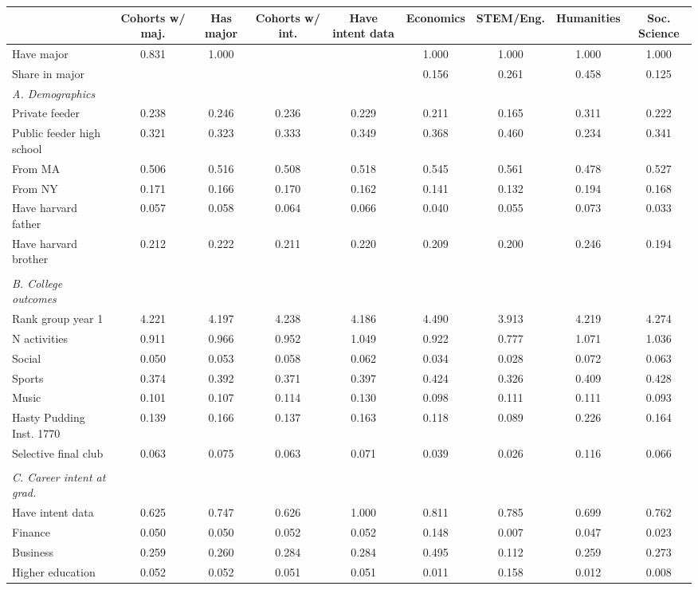 \begin{tabular}{l*{8}{c}}
\toprule
& Cohorts w/ maj.& Has major& Cohorts w/ int.& Have intent data& Economics& STEM/Eng.& Humanities& Soc. Science\\
\midrule
Have major	&    0.831	&    1.000	&	&	&    1.000	&    1.000	&    1.000	&    1.000\\
Share in major	&	&	&	&	&    0.156	&    0.261	&    0.458	&    0.125\\
\emph{A. Demographics}\\
Private feeder& 0.238& 0.246& 0.236& 0.229& 0.211& 0.165& 0.311& 0.222\\
Public feeder high school& 0.321& 0.323& 0.333& 0.349& 0.368& 0.460& 0.234& 0.341\\
From MA& 0.506& 0.516& 0.508& 0.518& 0.545& 0.561& 0.478& 0.527\\
From NY& 0.171& 0.166& 0.170& 0.162& 0.141& 0.132& 0.194& 0.168\\
Have harvard father& 0.057& 0.058& 0.064& 0.066& 0.040& 0.055& 0.073& 0.033\\
Have harvard brother& 0.212& 0.222& 0.211& 0.220& 0.209& 0.200& 0.246& 0.194\\
\\[-1.0em]
\emph{B. College outcomes}\\
Rank group year 1& 4.221& 4.197& 4.238& 4.186& 4.490& 3.913& 4.219& 4.274\\
N activities& 0.911& 0.966& 0.952& 1.049& 0.922& 0.777& 1.071& 1.036\\
Social& 0.050& 0.053& 0.058& 0.062& 0.034& 0.028& 0.072& 0.063\\
Sports& 0.374& 0.392& 0.371& 0.397& 0.424& 0.326& 0.409& 0.428\\
Music& 0.101& 0.107& 0.114& 0.130& 0.098& 0.111& 0.111& 0.093\\
Hasty Pudding Inst. 1770& 0.139& 0.166& 0.137& 0.163& 0.118& 0.089& 0.226& 0.164\\
Selective final club& 0.063& 0.075& 0.063& 0.071& 0.039& 0.026& 0.116& 0.066\\
\\[-1.0em]
\emph{C. Career intent at grad.}\\
Have intent data& 0.625& 0.747& 0.626& 1.000& 0.811& 0.785& 0.699& 0.762\\
Finance& 0.050& 0.050& 0.052& 0.052& 0.148& 0.007& 0.047& 0.023\\
Business& 0.259& 0.260& 0.284& 0.284& 0.495& 0.112& 0.259& 0.273\\
Higher education& 0.052& 0.052& 0.051& 0.051& 0.011& 0.158& 0.012& 0.008\\

\end{tabular}
